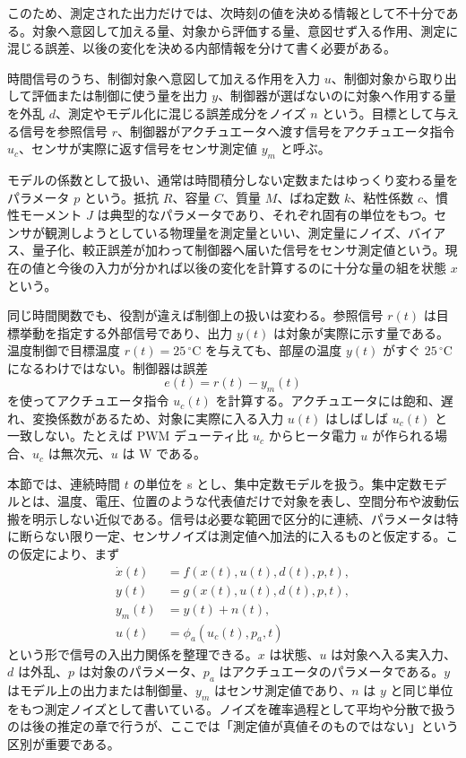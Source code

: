 このため、測定された出力だけでは、次時刻の値を決める情報として不十分である。対象へ意図して加える量、対象から評価する量、意図せず入る作用、測定に混じる誤差、以後の変化を決める内部情報を分けて書く必要がある。

\begin{definition}[信号の役割]
時間信号のうち、制御対象へ意図して加える作用を入力 $u$、制御対象から取り出して評価または制御に使う量を出力 $y$、制御器が選ばないのに対象へ作用する量を外乱 $d$、測定やモデル化に混じる誤差成分をノイズ $n$ という。目標として与える信号を参照信号 $r$、制御器がアクチュエータへ渡す信号をアクチュエータ指令 $u_c$、センサが実際に返す信号をセンサ測定値 $y_m$ と呼ぶ。
\end{definition}

\begin{definition}
モデルの係数として扱い、通常は時間積分しない定数またはゆっくり変わる量をパラメータ $p$ という。抵抗 $R$、容量 $C$、質量 $M$、ばね定数 $k$、粘性係数 $c$、慣性モーメント $J$ は典型的なパラメータであり、それぞれ固有の単位をもつ。センサが観測しようとしている物理量を測定量といい、測定量にノイズ、バイアス、量子化、較正誤差が加わって制御器へ届いた信号をセンサ測定値という。現在の値と今後の入力が分かれば以後の変化を計算するのに十分な量の組を状態 $x$ という。
\end{definition}

同じ時間関数でも、役割が違えば制御上の扱いは変わる。参照信号 $r(t)$ は目標挙動を指定する外部信号であり、出力 $y(t)$ は対象が実際に示す量である。温度制御で目標温度 $r(t)=25\,^\circ\mathrm{C}$ を与えても、部屋の温度 $y(t)$ がすぐ $25\,^\circ\mathrm{C}$ になるわけではない。制御器は誤差
\begin{equation}
  e(t)=r(t)-y_m(t)
  \label{eq:feedback-error-signal}
\end{equation}
を使ってアクチュエータ指令 $u_c(t)$ を計算する。アクチュエータには飽和、遅れ、変換係数があるため、対象に実際に入る入力 $u(t)$ はしばしば $u_c(t)$ と一致しない。たとえば PWM デューティ比 $u_c$ からヒータ電力 $u$ が作られる場合、$u_c$ は無次元、$u$ は W である。

本節では、連続時間 $t$ の単位を s とし、集中定数モデルを扱う。集中定数モデルとは、温度、電圧、位置のような代表値だけで対象を表し、空間分布や波動伝搬を明示しない近似である。信号は必要な範囲で区分的に連続、パラメータは特に断らない限り一定、センサノイズは測定値へ加法的に入るものと仮定する。この仮定により、まず
\begin{align}
  \dot{x}(t)&=f(x(t),u(t),d(t),p,t),\label{eq:plant-signal-model}\\
  y(t)&=g(x(t),u(t),d(t),p,t),\\
  y_m(t)&=y(t)+n(t),\\
  u(t)&=\phi_a(u_c(t),p_a,t)
\end{align}
という形で信号の入出力関係を整理できる。$x$ は状態、$u$ は対象へ入る実入力、$d$ は外乱、$p$ は対象のパラメータ、$p_a$ はアクチュエータのパラメータである。$y$ はモデル上の出力または制御量、$y_m$ はセンサ測定値であり、$n$ は $y$ と同じ単位をもつ測定ノイズとして書いている。ノイズを確率過程として平均や分散で扱うのは後の推定の章で行うが、ここでは「測定値が真値そのものではない」という区別が重要である。

